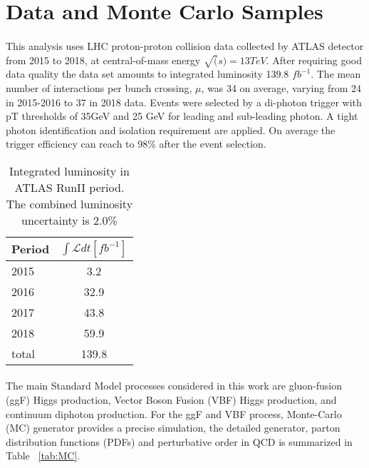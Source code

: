 \section{Data and Monte Carlo Samples}
\label{sec:dataMC}

\paragraph{} This analysis uses LHC proton-proton collision data collected by ATLAS detector from 2015 to 2018, at central-of-mass energy $\sqrt(s)=13TeV$. After requiring good data quality the data set amounts to integrated luminosity 139.8 $fb^{-1}$. The mean number of interactions per bunch crossing, $\mu$, was 34 on average, varying from $24$ in 2015-2016 to $37$ in 2018 data. Events were selected by a di-photon trigger with pT thresholds of 35GeV and 25 GeV for leading and sub-leading photon. A tight photon identification and isolation requirement are applied. On average the trigger efficiency can reach to 98\% after the event selection. 

\begin{table}[htbp]
\centering
\begin{tabular}{l|c}
\hline
Period & $\int \mathcal{L} dt [fb^{-1}]$ \\ \hline
2015   & 3.2                   \\
2016   & 32.9                  \\
2017   & 43.8                  \\
2018   & 59.9                  \\ \hline
total  & 139.8                 \\
\hline
\end{tabular}
\caption{Integrated luminosity in ATLAS RunII period. The combined luminosity uncertainty is 2.0\% }
\label{tab:dataLumi}
\end{table}

\paragraph{} The main Standard Model processes considered in this work are gluon-fusion (ggF) Higgs production, Vector Boson Fusion (VBF) Higgs production, and continuum diphoton production. For the ggF and VBF process, Monte-Carlo (MC) generator provides a precise simulation, the detailed generator, parton distribution functions (PDFs) and perturbative order in QCD is summarized in Table ~\ref{tab:MC}. 

